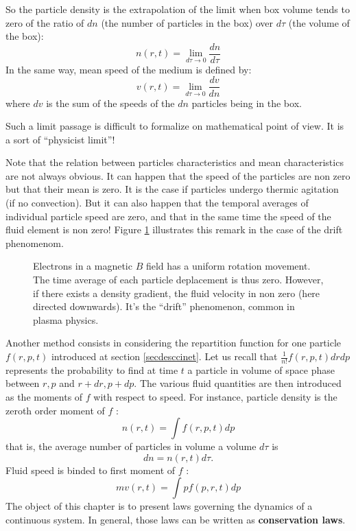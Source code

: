 \documentclass[12pt]{book}
\begin{document}
So the particle density is the extrapolation of the limit when box volume
tends to zero of the ratio of $dn$ (the number of particles in the box) over
$d\tau$ (the volume of the box):
\begin{equation}
n(r,t)=\lim_{d\tau\rightarrow 0}\frac{dn}{d\tau}
\end{equation}
In the same way, mean speed of the medium is defined by:
\begin{equation}
v(r,t)=\lim_{d\tau\rightarrow 0}\frac{dv}{dn}
\end{equation}
where $dv$ is the sum of the speeds of the $dn$ particles being in the box.
\begin{rem}
Such a limit passage is difficult to formalize on mathematical point of view.
It is a sort of ``physicist limit''!
\end{rem}
\begin{rem}
Note that the relation between particles characteristics and mean
characteristics are not always obvious. It can happen that the speed of the
particles are non zero but that their mean is zero. It is the case if
particles undergo thermic agitation (if no convection). But it can also happen
that the temporal averages of individual particle speed are zero, and that in
the same time the speed of the fluid element is non zero! Figure
\ref{figvitnonul} illustrates this remark in the case of the drift
phenomenom\cite{ph:plasm:Chen84}.  
\begin{figure}[htb]
 \centerline{}   
 \caption{Electrons in a magnetic $B$ field has a uniform rotation
 movement. The time average of each particle deplacement is thus
 zero. However, if there exists a density gradient, the fluid velocity
 in non zero (here directed downwards). It's the ``drift'' phenomenon,
 common in plasma physics.}
 \label{figvitnonul}
\end{figure}
\end{rem}
Another method consists in considering the repartition function for one
particle $f(r,p,t)$ introduced at section
\ref{secdesccinet}. Let us recall that $\frac{1}{n!}f(r,p,t)drdp$ represents
the probability to find at time $t$ a particle in volume of space phase
between $r,p$ and $r+dr,p+dp$. The various fluid quantities are then
introduced as the moments of $f$ with respect to speed. For instance, particle
density is the zeroth order moment of $f$ :
\begin{equation}
n(r,t)=\int f(r,p,t)dp
\end{equation}
that is, the average number of particles in volume a volume $d\tau$ is
\begin{equation}
dn=n(r,t)d\tau.
\end{equation}
Fluid speed is binded to first moment of $f$ :
\begin{equation}
mv(r,t)=\int pf(p,r,t)dp
\end{equation}
The object of this chapter is to present laws governing the dynamics of a
continuous system. In general, those laws can be written as {\bf conservation
  laws}. 
\end{document}
